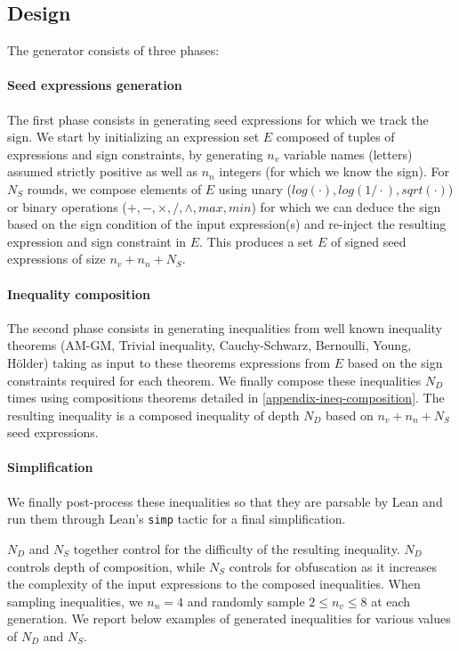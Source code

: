 \documentclass[nohyperref]{article}
\theoremstyle{plain}
\theoremstyle{definition}
\theoremstyle{remark}
\begin{document}
\subsection{Design}

The generator consists of three phases:

\paragraph{Seed expressions generation} The first phase consists in generating seed expressions for which we track the sign. We start by initializing an expression set $E$ composed of tuples of expressions and sign constraints, by generating $n_v$ variable names (letters) assumed strictly positive as well as $n_n$ integers (for which we know the sign). For $N_S$ rounds, we compose elements of $E$ using unary ($log(\cdot ), log(1/\cdot ), sqrt(\cdot )$) or binary operations ($+, -, \times, /, \wedge , max, min$) for which we can deduce the sign based on the sign condition of the input expression(s) and re-inject the resulting expression and sign constraint in $E$. This produces a set $E$ of signed seed expressions of size $n_v+n_n+N_S$.

\paragraph{Inequality composition} The second phase consists in generating inequalities from well known inequality theorems (AM-GM, Trivial inequality, Cauchy-Schwarz, Bernoulli, Young, Hölder) taking as input to these theorems expressions from $E$ based on the sign constraints required for each theorem. We finally compose these inequalities $N_D$ times using compositions theorems detailed in \ref{appendix-ineq-composition}. The resulting inequality is a composed inequality of depth $N_D$ based on $n_v+n_n+N_S$ seed expressions.

\paragraph{Simplification} We finally post-process these inequalities so that they are parsable by Lean and run them through Lean's \texttt{simp} tactic for a final simplification.

$N_D$ and $N_S$ together control for the difficulty of the resulting inequality. $N_D$ controls depth of composition, while $N_S$ controls for obfuscation as it increases the complexity of the input expressions to the composed inequalities. When sampling inequalities, we $n_n = 4$ and randomly sample $2 \leq n_v \leq 8$ at each generation. We report below examples of generated inequalities for various values of $N_D$ and $N_S$.
\end{document}
